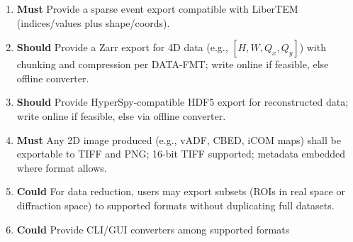 \documentclass[10pt]{article}
\newcommand{\PriorityTag}[2]{%
    \colorbox{#2!25}{\footnotesize\textsf{\textbf{#1}}}\hspace{0.6em}}
\newcommand{\must}{\leavevmode\PriorityTag{Must}{green}}
\newcommand{\should}{\leavevmode\PriorityTag{Should}{yellow}}
\newcommand{\could}{\leavevmode\PriorityTag{Could}{cyan}}
\newcounter{reqgrp}[section] %
\newcounter{reqno}
\newcommand{\reqprefix}{GEN}
\newenvironment{requirements}[1]{%
    \renewcommand{\reqprefix}{#1}%
    \refstepcounter{reqgrp}%
    \setcounter{reqno}{0}%
    \begin{enumerate}[leftmargin=*]
    }{\end{enumerate}}
\begin{document}
\begin{requirements}{OUT}
        \item \must {}
        {Provide a sparse event export compatible with LiberTEM (indices/values plus shape/coords).}

        \item \should {}
        {Provide a Zarr export for 4D data (e.g., \([H,W,Q_x,Q_y]\)) with chunking and compression per DATA-FMT; write online if feasible, else offline converter.}

        \item \should {}
        {Provide HyperSpy-compatible HDF5 export for reconstructed data; write online if feasible, else via offline converter.}

        \item \must {}
        {Any 2D image produced (e.g., vADF, CBED, iCOM maps) shall be exportable to TIFF and PNG; 16-bit TIFF supported; metadata embedded where format allows.}

        \item \could {}
        {For data reduction, users may export subsets (ROIs in real space or diffraction space) to supported formats without duplicating full datasets.}

        \item \could {}
        {Provide CLI/GUI converters among supported formats}


\end{requirements}
\end{document}

